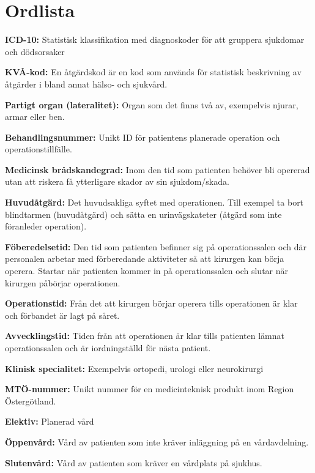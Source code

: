 \section{Ordlista}
\textbf{ICD-10: }
Statistisk klassifikation med diagnoskoder för att gruppera sjukdomar och dödsorsaker

\textbf{KVÅ-kod: }
En åtgärdskod är en kod som används för statistisk beskrivning av åtgärder i bland annat hälso- och sjukvård.

\textbf{Partigt organ (lateralitet): }
Organ som det finns två av, exempelvis njurar, armar eller ben.

\textbf{Behandlingsnummer: }
Unikt ID för patientens planerade operation och operationstillfälle.

\textbf{Medicinsk brådskandegrad: }
Inom den tid som patienten behöver bli opererad utan att riskera få ytterligare skador av sin sjukdom/skada.

\textbf{Huvudåtgärd: }
Det huvudsakliga syftet med operationen. Till exempel ta bort blindtarmen  (huvudåtgärd) och sätta en urinvägskateter (åtgärd som inte föranleder operation).

\textbf{Föberedelsetid: }
Den tid som patienten befinner sig på operationssalen och där personalen arbetar med förberedande aktiviteter så att kirurgen kan börja operera. Startar när patienten kommer in på operationssalen och slutar när kirurgen påbörjar operationen.

\textbf{Operationstid: }
Från det att kirurgen börjar operera tills operationen är klar och förbandet är lagt på såret.

\textbf{Avvecklingstid: }
Tiden från att operationen är klar tills patienten lämnat operationssalen och är iordningställd för nästa patient.

\textbf{Klinisk specialitet: }
Exempelvis ortopedi, urologi eller neurokirurgi

\textbf{MTÖ-nummer: }
Unikt nummer för en medicinteknisk produkt inom Region Östergötland.

\textbf{Elektiv: }
Planerad vård

\textbf{Öppenvård: }
Vård av patienten som inte kräver inläggning på en vårdavdelning.

\textbf{Slutenvård: }
Vård av patienten som kräver en vårdplats på sjukhus.
